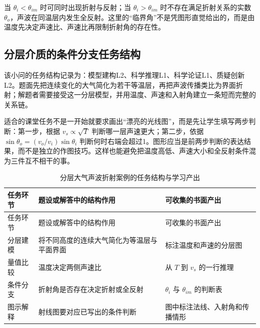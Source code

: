 \documentclass[
  12pt,
  a4paper]{ctexbook}
\begin{document}
当 \(\theta_i<\theta_{im}\) 时可同时出现折射与反射；当
\(\theta_i>\theta_{im}\) 时不存在满足折射关系的实数
\(\theta_o\)，声波在同温层内发生全反射。这里的``临界角''不是凭图形直觉给出的，而是由温度先决定声速比、声速比再限制折射角的存在性。

\subsection{分层介质的条件分支任务结构}\label{ux5206ux5c42ux4ecbux8d28ux7684ux6761ux4ef6ux5206ux652fux4efbux52a1ux7ed3ux6784}

该小问的任务结构记录为：模型建构L2、科学推理L1、科学论证L1、质疑创新L2。题面先把连续变化的大气简化为若干等温层，再把声波传播类比为界面折射；解题者需要接受这一分层模型，并用温度、声速和入射角建立一条短而完整的关系链。

适合的课堂任务不是一开始就要求画出``漂亮的光线图''，而是先让学生填写两步判断：第一步，根据
\(v_s\propto\sqrt T\) 判断哪一层声速更大；第二步，依据
\(\sin\theta_o=(v_o/v_i)\sin\theta_i\)
判断何时右端会超过1。图形应当是前两步判断的表达结果，而不是独立的作图技巧。这样也能避免把温度高低、声速大小和全反射条件混为三件互不相干的事。

\begin{longtable}[]{@{}
  >{\raggedright\arraybackslash}p{}
  >{\raggedright\arraybackslash}p{}
  >{\raggedright\arraybackslash}p{}@{}}
\caption{分层大气声波折射案例的任务结构与学习产出}\tabularnewline
\toprule\noalign{}
\rowcolor{ThesisPale}
\begin{minipage}[b]{\linewidth}\raggedright
任务环节
\end{minipage} & \begin{minipage}[b]{\linewidth}\raggedright
题设或解答中的结构作用
\end{minipage} & \begin{minipage}[b]{\linewidth}\raggedright
可收集的书面产出
\end{minipage} \\
\midrule\noalign{}
\endfirsthead
\toprule\noalign{}
\rowcolor{ThesisPale}
\begin{minipage}[b]{\linewidth}\raggedright
任务环节
\end{minipage} & \begin{minipage}[b]{\linewidth}\raggedright
题设或解答中的结构作用
\end{minipage} & \begin{minipage}[b]{\linewidth}\raggedright
可收集的书面产出
\end{minipage} \\
\midrule\noalign{}
\endhead
\bottomrule\noalign{}
\endlastfoot
分层建模 & 将不同高度的连续大气简化为等温层与平面界面 &
标注温度和声速的分层图 \\
量值比较 & 温度决定两侧声速比 & 从 \(T\) 到 \(v_s\) 的一行推理 \\
条件分支 & 折射角是否存在决定折射或全反射 & \(\theta_i\) 与
\(\theta_{im}\) 的判断表 \\
图示解释 & 射线图要对应已写出的条件判断 &
图中标注法线、入射角和传播情形 \\
\end{longtable}
\end{document}
